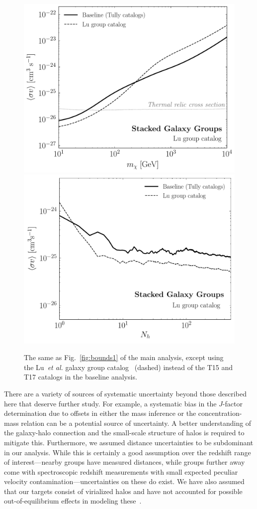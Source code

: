 \begin{figure}[t]
  \centering
  \includegraphics[width=.45\textwidth]{ch-clusters/plots/systematics_lu.pdf}
   \includegraphics[width=.45\textwidth]{ch-clusters/plots/systematics_lu_elephant.pdf} 
  \caption{The same as Fig.~\ref{fig:bounds1} of the main analysis, except using the Lu~\emph{et al.} galaxy group catalog~\cite{Lu:2016vmu} (dashed) instead of the T15 and T17 catalogs in the baseline analysis. }
  \label{fig:lucatalog}
\end{figure}

\noindent There are a variety of sources of systematic uncertainty beyond those described here that  deserve further study.  For example, a systematic bias in the $J$-factor determination due to offsets in either the mass inference or the concentration-mass relation can be a potential source of uncertainty. A better understanding of the galaxy-halo connection and the small-scale structure of halos is required to mitigate this. Furthermore, we assumed distance uncertainties to be subdominant in our analysis. While this is certainly a good assumption over the redshift range of interest---nearby groups have measured distances, while groups further away come with spectroscopic redshift measurements with small expected peculiar velocity contamination---uncertainties on these do exist. We have also assumed that our targets consist of virialized halos and have not accounted for possible out-of-equilibrium effects in modeling these~\cite{1993AJ....105.2035D}.